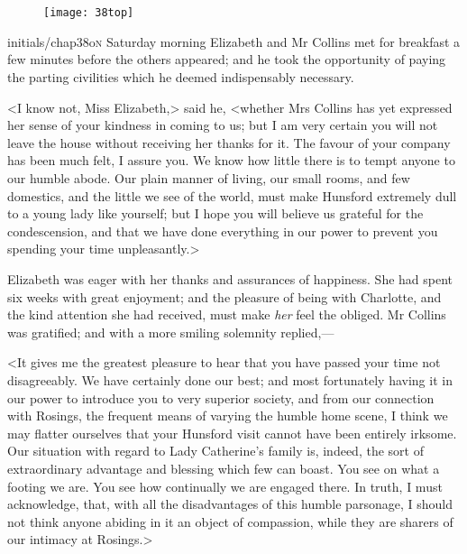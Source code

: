 \chapter[Chapter \thechapter]{}
	
\begin{figure}[t!]
\centering
\texttt{[image: 38top]}
\end{figure}


\lettrine[lines=6,image=true]{initials/chap38o}{n} Saturday morning Elizabeth and Mr Collins met for breakfast a few minutes before the others appeared; and he took the opportunity of paying the parting civilities which he deemed indispensably necessary.

\zz
<I know not, Miss Elizabeth,> said he, <whether Mrs Collins has yet expressed her sense of your kindness in coming to us; but I am very certain you will not leave the house without receiving her thanks for it. The favour of your company has been much felt, I assure you. We know how little there is to tempt anyone to our humble abode. Our plain manner of living, our small rooms, and few domestics, and the little we see of the world, must make Hunsford extremely dull to a young lady like yourself; but I hope you will believe us grateful for the condescension, and that we have done everything in our power to prevent you spending your time unpleasantly.>

Elizabeth was eager with her thanks and assurances of happiness. She had spent six weeks with great enjoyment; and the pleasure of being with Charlotte, and the kind attention she had received, must make \textit{her} feel the obliged. Mr Collins was gratified; and with a more smiling solemnity replied,—

<It gives me the greatest pleasure to hear that you have passed your time not disagreeably. We have certainly done our best; and most fortunately having it in our power to introduce you to very superior society, and from our connection with Rosings, the frequent means of varying the humble home scene, I think we may flatter ourselves that your Hunsford visit cannot have been entirely irksome. Our situation with regard to Lady Catherine's family is, indeed, the sort of extraordinary advantage and blessing which few can boast. You see on what a footing we are. You see how continually we are engaged there. In truth, I must acknowledge, that, with all the disadvantages of this humble parsonage, I should not think anyone abiding in it an object of compassion, while they are sharers of our intimacy at Rosings.>

